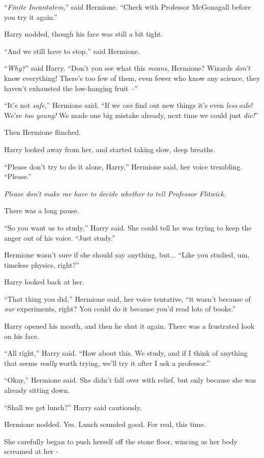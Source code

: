``\emph{Finite Incantatem},'' said Hermione. ``Check with Professor McGonagall before you try it again.''

Harry nodded, though his face was still a bit tight.

``And we still have to stop,'' said Hermione.

``\emph{Why?}'' said Harry. ``Don't you see what this \emph{means}, Hermione? Wizards \emph{don't} know everything! There's too few of them, even fewer who know any science, they haven't exhausted the low-hanging fruit~-''

``It's not \emph{safe},'' Hermione said. ``If we \emph{can} find out new things it's even \emph{less} safe! We're \emph{too young!} We made one big mistake already, next time we could just \emph{die!}''

Then Hermione flinched.

Harry looked away from her, and started taking slow, deep breaths.

``Please don't try to do it alone, Harry,'' Hermione said, her voice trembling. ``Please.''

\emph{Please don't make me have to decide whether to tell Professor Flitwick.}

There was a long pause.

``So you want us to study,'' Harry said. She could tell he was trying to keep the anger out of his voice. ``Just study.''

Hermione wasn't sure if she should say anything, but... ``Like you studied, um, timeless physics, right?''

Harry looked back at her.

``That thing you did,'' Hermione said, her voice tentative, ``it wasn't because of \emph{our} experiments, right? You could do it because you'd read lots of books.''

Harry opened his mouth, and then he shut it again. There was a frustrated look on his face.

``All right,'' Harry said. ``How about this. We study, and if I think of anything that seems \emph{really} worth trying, we'll try it after I ask a professor.''

``Okay,'' Hermione said. She didn't fall over with relief, but only because she was already sitting down.

``Shall we get lunch?'' Harry said cautiously.

Hermione nodded. Yes. Lunch sounded good. For real, this time.

She carefully began to push herself off the stone floor, wincing as her body screamed at her -

